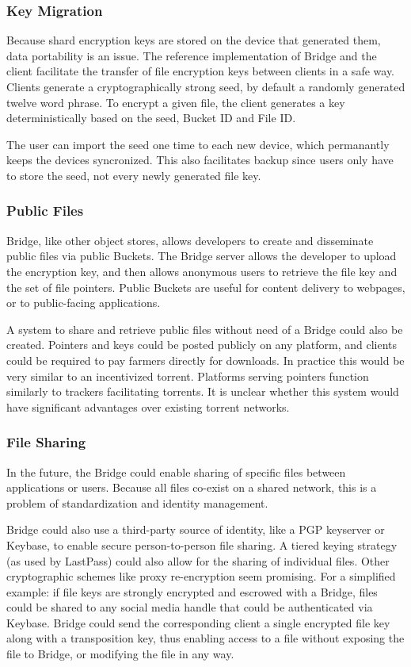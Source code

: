 \documentclass[a4paper,10pt]{article}
\begin{document}
\subsubsection{Key Migration}
Because shard encryption keys are stored on the device that generated them, data portability is an issue. The reference implementation of Bridge and the client facilitate the transfer of file encryption keys between clients in a safe way. Clients generate a cryptographically strong seed, by default a randomly generated twelve word phrase. To encrypt a given file, the client generates a key deterministically based on the seed, Bucket ID and File ID.

The user can import the seed one time to each new device, which permanantly keeps the devices syncronized. This also facilitates backup since users only have to store the seed, not every newly generated file key.

\subsubsection{Public Files}
Bridge, like other object stores, allows developers to create and disseminate public files via public Buckets. The Bridge server allows the developer to upload the encryption key, and then allows anonymous users to retrieve the file key and the set of file pointers. Public Buckets are useful for content delivery to webpages, or to public-facing applications.

A system to share and retrieve public files without need of a Bridge could also be created. Pointers and keys could be posted publicly on any platform, and clients could be required to pay farmers directly for downloads. In practice this would be very similar to an incentivized torrent. Platforms serving pointers function similarly to trackers facilitating torrents. It is unclear whether this system would have significant advantages over existing torrent networks.

\subsubsection{File Sharing}
In the future, the Bridge could enable sharing of specific files between applications or users. Because all files co-exist on a shared network, this is a problem of standardization and identity management.

Bridge could also use a third-party source of identity, like a PGP keyserver or Keybase\cite{29}, to enable secure person-to-person file sharing. A tiered keying strategy (as used by LastPass\cite{28}) could also allow for the sharing of individual files. Other cryptographic schemes like proxy re-encryption seem promising. For a simplified example: if file keys are strongly encrypted and escrowed with a Bridge, files could be shared to any social media handle that could be authenticated via Keybase. Bridge could send the corresponding client a single encrypted file key along with a transposition key, thus enabling access to a file without exposing the file to Bridge, or modifying the file in any way.
\end{document}
